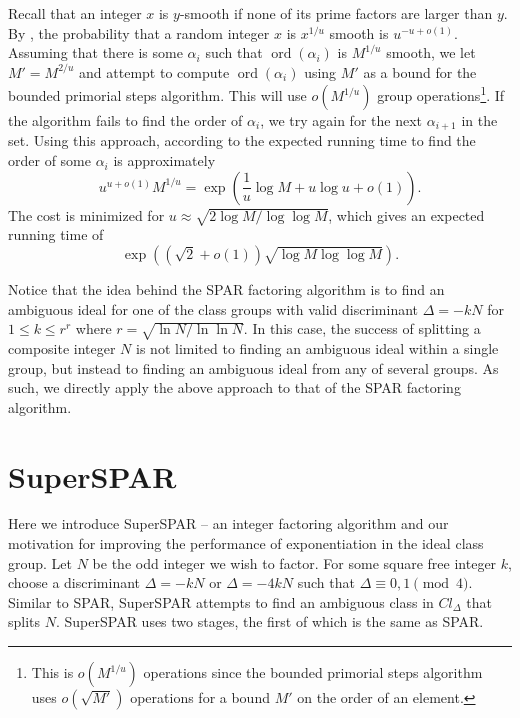\documentclass{ucalgthes1}
\theoremstyle{definition}
\DeclareMathOperator{\ord}{ord}
\begin{document}
Recall that an integer $x$ is $y$-smooth if none of its prime factors are larger than $y$.  By \cite[p.81]{Sutherland2007}, the probability that a random integer $x$ is $x^{1/u}$ smooth is $u^{-u+o(1)}$.  Assuming that there is some $\alpha_i$ such that $\ord(\alpha_i)$ is $M^{1/u}$ smooth, we let $M'=M^{2/u}$ and attempt to compute $\ord(\alpha_i)$ using $M'$ as a bound for the bounded primorial steps algorithm.  This will use $o(M^{1/u})$ group operations\footnote{This is $o(M^{1/u})$ operations since the bounded primorial steps algorithm uses $o(\sqrt{M'})$ operations for a bound $M'$ on the order of an element.}.  If the algorithm fails to find the order of $\alpha_i$, we try again for the next $\alpha_{i+1}$ in the set.  Using this approach, according to \cite[pp.81--82]{Sutherland2007} the expected running time to find the order of some $\alpha_i$ is approximately
\[
	u^{u+o(1)}M^{1/u} = \exp \left( \frac{1}{u}\log M + u \log u + o(1) \right).
\]
The cost is minimized for $u \approx \sqrt{2 \log M / \log \log M}$, which gives an expected running time of
\[
	\exp \left( \left( \sqrt2 + o(1) \right) \sqrt{\log M \log \log M} \right).
\]


Notice that the idea behind the SPAR factoring algorithm is to find an ambiguous ideal for one of the class groups with valid discriminant $\Delta = -kN$ for $1 \le k \le r^r$ where $r = \sqrt{\ln N / \ln \ln N}$.  In this case, the success of splitting a composite integer $N$ is not limited to finding an ambiguous ideal within a single group, but instead to finding an ambiguous ideal from any of several groups.  As such, we directly apply the above approach to that of the SPAR factoring algorithm.


\section{SuperSPAR}
\label{sec:superSpar}

Here we introduce SuperSPAR -- an integer factoring algorithm and our motivation for improving the performance of exponentiation in the ideal class group.  Let $N$ be the odd integer we wish to factor.  For some square free integer $k$, choose a discriminant $\Delta = -kN$ or $\Delta = -4kN$ such that $\Delta \equiv 0, 1 \pmod 4$.  Similar to SPAR, SuperSPAR attempts to find an ambiguous class in $Cl_\Delta$ that splits $N$.  SuperSPAR uses two stages, the first of which is the same as SPAR.
\end{document}
